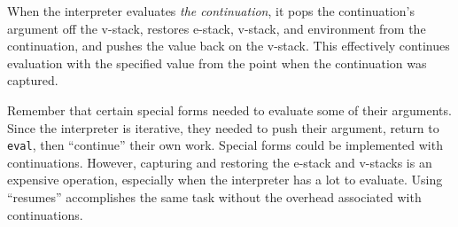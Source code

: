 	When the interpreter evaluates {\em the continuation}, it pops the
continuation's argument off the v-stack, restores e-stack, v-stack, and
environment from the continuation, and pushes the value back on the
v-stack.  This effectively continues evaluation with the specified value
from the point when the continuation was captured.

	Remember that certain special forms needed to evaluate some of
their arguments.  Since the interpreter is iterative, they needed to push
their argument, return to {\tt eval}, then ``continue'' their own work.
Special forms could be implemented with continuations.  However, capturing
and restoring the e-stack and v-stacks is an expensive operation,
especially when the interpreter has a lot to evaluate.  Using ``resumes''
accomplishes the same task without the overhead associated with
continuations.


